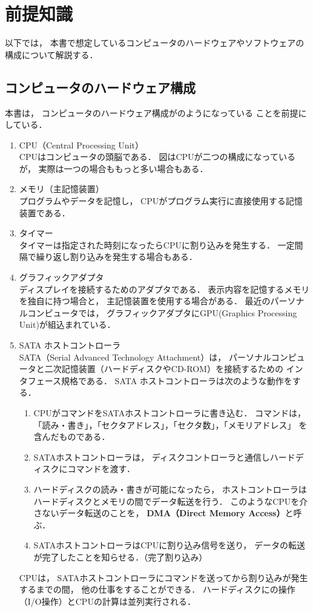 \chapter{前提知識}
以下では，
本書で想定しているコンピュータのハードウェアやソフトウェアの
構成について解説する．

\section{コンピュータのハードウェア構成}
本書は，
コンピュータのハードウェア構成がのようになっている
ことを前提にしている．


\begin{enumerate}
\item CPU（Central Processing Unit） \\
CPUはコンピュータの頭脳である．
図はCPUが二つの構成になっているが，
実際は一つの場合ももっと多い場合もある．

\item メモリ（主記憶装置） \\
プログラムやデータを記憶し，
CPUがプログラム実行に直接使用する記憶装置である．

\item タイマー \\
タイマーは指定された時刻になったらCPUに割り込みを発生する．
一定間隔で繰り返し割り込みを発生する場合もある．

\item グラフィックアダプタ \\
ディスプレイを接続するためのアダプタである．
表示内容を記憶するメモリを独自に持つ場合と，
主記憶装置を使用する場合がある．
最近のパーソナルコンピュータでは，
グラフィックアダプタにGPU(Graphics Processing Unit)が組込まれている．

\item SATA ホストコントローラ　\\
SATA（Serial Advanced Technology Attachment）は，
パーソナルコンピュータと二次記憶装置（ハードディスクやCD-ROM）を接続するための
インタフェース規格である．
SATA ホストコントローラは次のような動作をする．
\begin{enumerate}
\item CPUがコマンドをSATAホストコントローラに書き込む．
コマンドは，
「読み・書き」，「セクタアドレス」，「セクタ数」，「メモリアドレス」
を含んだものである．
\item SATAホストコントローラは，
ディスクコントローラと通信しハードディスクにコマンドを渡す．
\item ハードディスクの読み・書きが可能になったら，
ホストコントローラはハードディスクとメモリの間でデータ転送を行う．
このようなCPUを介さないデータ転送のことを，
{\bf DMA（Direct Memory Access）}と呼ぶ．
\item SATAホストコントローラはCPUに割り込み信号を送り，
データの転送が完了したことを知らせる．（完了割り込み）
\end{enumerate}
CPUは，
SATAホストコントローラにコマンドを送ってから割り込みが発生するまでの間，
他の仕事をすることができる．
ハードディスクにの操作（I/O操作）とCPUの計算は並列実行される．


\end{enumerate}
